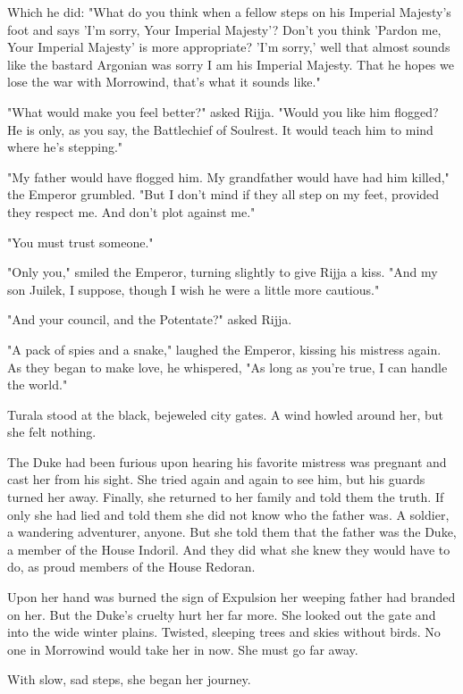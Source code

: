 Which he did: "What do you think when a fellow steps on his Imperial Majesty's foot and says 'I'm sorry, Your Imperial Majesty'? Don't you think 'Pardon me, Your Imperial Majesty' is more appropriate? 'I'm sorry,' well that almost sounds like the bastard Argonian was sorry I am his Imperial Majesty. That he hopes we lose the war with Morrowind, that's what it sounds like."

"What would make you feel better?" asked Rijja. "Would you like him flogged? He is only, as you say, the Battlechief of Soulrest. It would teach him to mind where he's stepping."

"My father would have flogged him. My grandfather would have had him killed," the Emperor grumbled. "But I don't mind if they all step on my feet, provided they respect me. And don't plot against me."

"You must trust someone."

"Only you," smiled the Emperor, turning slightly to give Rijja a kiss. "And my son Juilek, I suppose, though I wish he were a little more cautious."

"And your council, and the Potentate?" asked Rijja.

"A pack of spies and a snake," laughed the Emperor, kissing his mistress again. As they began to make love, he whispered, "As long as you're true, I can handle the world."

Turala stood at the black, bejeweled city gates. A wind howled around her, but she felt nothing.

The Duke had been furious upon hearing his favorite mistress was pregnant and cast her from his sight. She tried again and again to see him, but his guards turned her away. Finally, she returned to her family and told them the truth. If only she had lied and told them she did not know who the father was. A soldier, a wandering adventurer, anyone. But she told them that the father was the Duke, a member of the House Indoril. And they did what she knew they would have to do, as proud members of the House Redoran.

Upon her hand was burned the sign of Expulsion her weeping father had branded on her. But the Duke's cruelty hurt her far more. She looked out the gate and into the wide winter plains. Twisted, sleeping trees and skies without birds. No one in Morrowind would take her in now. She must go far away.

With slow, sad steps, she began her journey.

